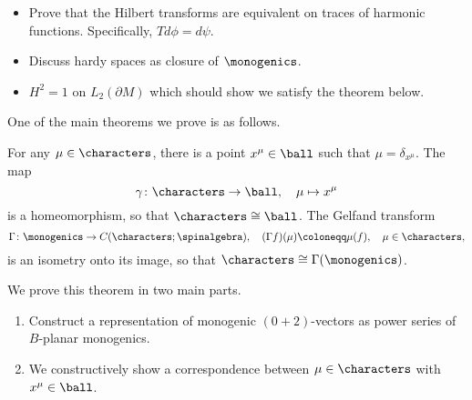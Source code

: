 \begin{itemize}
    \item Prove that the Hilbert transforms are equivalent on traces of harmonic functions. Specifically, $Td\phi = d\psi$.  
    \item Discuss hardy spaces as closure of $\monogenics$. 
    \item $H^2=1$ on $L_2(\partial M)$ which should show we satisfy the theorem below.
\end{itemize}

One of the main theorems we prove is as follows.

\begin{theorem}
For any $\mu \in \characters$, there is a point $x^\mu \in \ball$ such that $\mu = \delta_{x^\mu}$. The map
\[
\gamma \colon \characters \to \ball, \quad \mu \mapsto x^\mu
\]
is a homeomorphism, so that $\characters \cong \ball$. The Gelfand transform
\[
\Gamma \colon \monogenics \to C(\characters; \spinalgebra), \quad (\Gamma f)(\mu) \coloneqq \mu(f), \quad \mu \in \characters,
\]
is an isometry onto its image, so that $\characters \cong \Gamma(\monogenics)$.
\end{theorem}

We prove this theorem in two main parts. 

\begin{enumerate}[1.]
    \item Construct a representation of monogenic $(0+2)$-vectors as power series of $B$-planar monogenics.
    \item We constructively show a correspondence between $\mu \in \characters$ with $x^\mu \in \ball$.  
\end{enumerate} 

